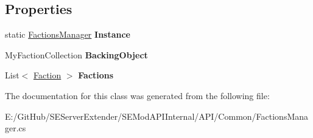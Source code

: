 \subsection*{Properties}
\begin{DoxyCompactItemize}
\item 
\hypertarget{class_s_e_mod_a_p_i_internal_1_1_a_p_i_1_1_common_1_1_factions_manager_af8e2d7358fdbf84efcfdf8d5e5dc3741}{}static \hyperlink{class_s_e_mod_a_p_i_internal_1_1_a_p_i_1_1_common_1_1_factions_manager}{Factions\+Manager} {\bfseries Instance}\label{class_s_e_mod_a_p_i_internal_1_1_a_p_i_1_1_common_1_1_factions_manager_af8e2d7358fdbf84efcfdf8d5e5dc3741}

\item 
\hypertarget{class_s_e_mod_a_p_i_internal_1_1_a_p_i_1_1_common_1_1_factions_manager_a6b61b3840c0730fdb22869e9b1a6fceb}{}My\+Faction\+Collection {\bfseries Backing\+Object}\label{class_s_e_mod_a_p_i_internal_1_1_a_p_i_1_1_common_1_1_factions_manager_a6b61b3840c0730fdb22869e9b1a6fceb}

\item 
\hypertarget{class_s_e_mod_a_p_i_internal_1_1_a_p_i_1_1_common_1_1_factions_manager_af2cfab38f1547e7868a22fed2ede6465}{}List$<$ \hyperlink{class_s_e_mod_a_p_i_internal_1_1_a_p_i_1_1_common_1_1_faction}{Faction} $>$ {\bfseries Factions}\label{class_s_e_mod_a_p_i_internal_1_1_a_p_i_1_1_common_1_1_factions_manager_af2cfab38f1547e7868a22fed2ede6465}

\end{DoxyCompactItemize}


The documentation for this class was generated from the following file\+:\begin{DoxyCompactItemize}
\item 
E\+:/\+Git\+Hub/\+S\+E\+Server\+Extender/\+S\+E\+Mod\+A\+P\+I\+Internal/\+A\+P\+I/\+Common/Factions\+Manager.\+cs\end{DoxyCompactItemize}
